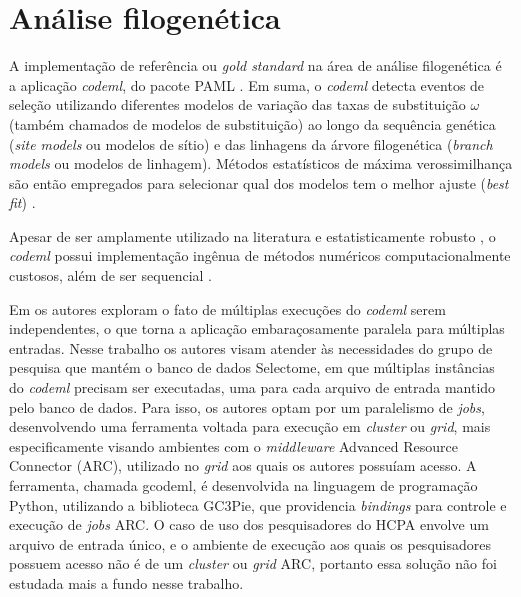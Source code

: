 \documentclass[cic,tc]{iiufrgs}
\begin{document}
\section{Análise filogenética}
\label{sec:filoant}

A implementação de referência ou \textit{gold standard} na área de análise
filogenética é a aplicação \textit{codeml}, do pacote PAML \cite{valle2014optimization}.
Em suma, o \textit{codeml} detecta eventos de seleção utilizando diferentes
modelos de variação das taxas de substituição $\omega$ (também chamados de
modelos de substituição) ao longo da sequência genética (\textit{site models}
ou modelos de sítio) e das linhagens da árvore filogenética (\textit{branch
models} ou modelos de linhagem). Métodos estatísticos de máxima verossimilhança
são então empregados para selecionar qual dos modelos tem o melhor ajuste
(\textit{best fit}) \cite{yang2007paml}. 

Apesar de ser amplamente utilizado na literatura e estatisticamente robusto
\cite{maldonado2016lmap}, o \textit{codeml} possui implementação ingênua de métodos
numéricos computacionalmente custosos, além de ser sequencial
\cite{yang2020paml}.

Em \cite{moretti2012gcodeml} os autores exploram o fato de múltiplas execuções
do \textit{codeml} serem independentes, o que torna a aplicação embaraçosamente
paralela para múltiplas entradas. Nesse trabalho os autores visam atender às
necessidades do grupo de pesquisa que mantém o banco de dados Selectome, em
que múltiplas instâncias do \textit{codeml} precisam ser executadas, uma para cada
arquivo de entrada mantido pelo banco de dados. Para isso, os autores optam
por um paralelismo de \textit{jobs}, desenvolvendo uma ferramenta voltada
para execução em \textit{cluster} ou \textit{grid}, mais especificamente
visando ambientes com o \textit{middleware} Advanced Resource Connector (ARC),
utilizado no \textit{grid} aos quais os autores possuíam acesso. A ferramenta,
chamada gcodeml, é desenvolvida na linguagem de programação Python, utilizando
a biblioteca GC3Pie, que providencia \textit{bindings} para controle e execução
de \textit{jobs} ARC. O caso de uso dos pesquisadores do HCPA envolve um
arquivo de entrada único, e o ambiente de execução aos quais os pesquisadores
possuem acesso não é de um \textit{cluster} ou \textit{grid} ARC, portanto essa
solução não foi estudada mais a fundo nesse trabalho.
\end{document}
